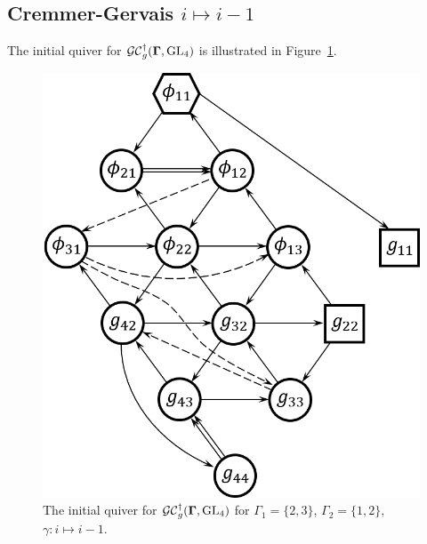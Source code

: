 \subsection{Cremmer-Gervais $i \mapsto i-1$}
The initial quiver for $\mathcal{GC}_g^{\dagger}(\mathbf{\Gamma},\operatorname{GL}_4)$ is illustrated in Figure~\ref{f:ex_n=4cg}.

\begin{figure}[htb]
\begin{center}
\includegraphics[scale=0.65]{g_convention/g_n=4_cg_i-i-1.png}
\end{center}
\caption{The initial quiver for $\mathcal{GC}^{\dagger}_g(\mathbf{\Gamma},\operatorname{GL}_4)$ for $\Gamma_1 = \{2,3\}$, $\Gamma_2 = \{1,2\}$, $\gamma:i \mapsto i-1$.}
\label{f:ex_n=4cg}
\end{figure}

